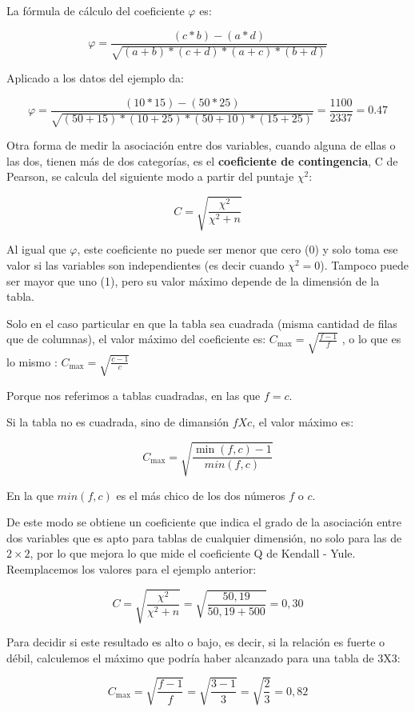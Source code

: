 \documentclass[]{book}
\begin{document}
La fórmula de cálculo del coeficiente \(\varphi\) es:

\[\varphi = \frac{(c*b) - (a*d)}{\sqrt{(a + b)*(c + d)*(a + c)*(b + d)}}\]

Aplicado a los datos del ejemplo da:

\[\varphi = \frac{(10*15) - (50*25)}{\sqrt{(50 + 15)*(10 + 25)*(50 + 10)*(15 + 25)}} = \frac{1100}{2337} = 0.47\]

Otra forma de medir la asociación entre dos variables, cuando alguna de ellas o las dos, tienen más de dos categorías, es el \textbf{coeficiente de contingencia}, C de Pearson, se calcula del siguiente modo a partir del puntaje \(\chi^{2}\):

\[C = \sqrt{\frac{\chi^{2}}{\chi^{2} + n}}\]

Al igual que \(\varphi\), este coeficiente no puede ser menor que cero (0) y solo toma ese valor si las variables son independientes (es decir cuando \(\chi^{2} = 0\)). Tampoco puede ser mayor que uno (1), pero su valor máximo depende de la dimensión de la tabla.

Solo en el caso particular en que la tabla sea cuadrada (misma cantidad de filas que de columnas), el valor máximo del coeficiente es: \(C_{\max} = \sqrt{\frac{f - 1}{f}}\) , o lo que es lo mismo :
\(C_{\max} = \sqrt{\frac{c - 1}{c}}\)

Porque nos referimos a tablas cuadradas, en las que \(f=c\).

Si la tabla no es cuadrada, sino de dimansión \(f X c\), el valor máximo es:

\[C_{\max} = \sqrt{\frac{\min(f,c) - 1}{min(f,c)}}\]

En la que \(min(f,c)\) es el más chico de los dos números \(f\) o \(c\).

De este modo se obtiene un coeficiente que indica el grado de la
asociación entre dos variables que es apto para tablas de cualquier dimensión, no solo para las de \(2 \times 2\), por lo que mejora lo que mide el coeficiente Q de Kendall - Yule. Reemplacemos los valores para el ejemplo anterior:

\[C = \sqrt{\frac{\chi^{2}}{\chi^{2} + n}} = \sqrt{\frac{50,19}{50,19 + 500}} = 0,30\]

Para decidir si este resultado es alto o bajo, es decir, si la relación es fuerte o débil, calculemos el máximo que podría haber alcanzado para una tabla de 3X3:

\[C_{\max} = \sqrt{\frac{f - 1}{f}} = \sqrt{\frac{3 - 1}{3}} = \sqrt{\frac{2}{3}} = 0,82\]
\end{document}
